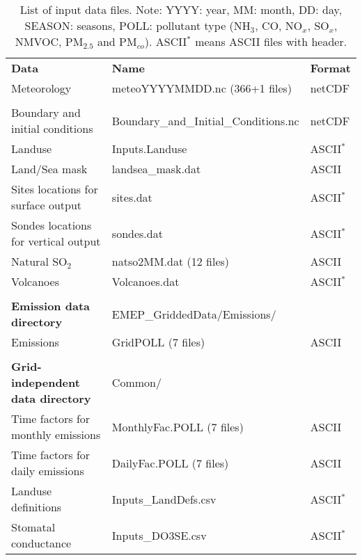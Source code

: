 \begin{table}
\caption[List of input data files]{List of input data files.
Note: YYYY: year, MM: month, DD: day, SEASON: seasons, POLL: pollutant
type (NH$_3$, CO, NO$_x$, SO$_x$, NMVOC,
PM$_{2.5}$ and PM$_{co}$). ASCII$^*$ means ASCII files with header.
\label{Tab:inputdata}}
\begin{small}
\hspace{-1cm}
\begin{tabular}{lll}
 && \\
\hline
{\bf Data} &  {\bf Name} & {\bf Format}\\
\hline\hline
\hline
Meteorology  &  meteoYYYYMMDD.nc \quad (366+1 files) & netCDF\\
& & \\
Boundary and initial conditions & Boundary\_and\_Initial\_Conditions.nc & netCDF\\
Landuse & Inputs.Landuse & ASCII$^*$\\
Land/Sea mask & landsea\_mask.dat & ASCII\\
Sites locations for surface output & sites.dat & ASCII$^*$\\
Sondes locations for vertical output & sondes.dat & ASCII$^*$\\
Natural SO$_2$ & natso2MM.dat  \quad (12 files) & ASCII\\
Volcanoes & Volcanoes.dat & ASCII$^*$\\
&& \\
{\bf Emission data directory } & EMEP\_GriddedData/Emissions/&  \\
\hline
Emissions & GridPOLL  \quad (7 files) & ASCII\\
&& \\
{\bf Grid-independent data directory} & Common/ & \\
\hline
Time factors for monthly emissions& MonthlyFac.POLL  \quad (7 files) & ASCII\\
Time factors for daily emissions &  DailyFac.POLL  \quad (7 files)
& ASCII\\
Landuse definitions & Inputs\_LandDefs.csv & ASCII$^*$\\
Stomatal conductance & Inputs\_DO3SE.csv & ASCII$^*$\\

\end{tabular}
\end{small}
\end{table}
